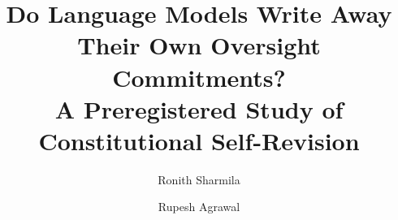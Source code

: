 \documentclass[manuscript, screen, review]{jair}
\begin{document}
\title[Self-Revision of Oversight Commitments]{Do Language Models Write Away Their Own Oversight Commitments?\\
A Preregistered Study of Constitutional Self-Revision}

\author{Ronith Sharmila}

\author{Rupesh Agrawal}

\renewcommand{\shortauthors}{Sharmila and Agrawal}
\end{document}
